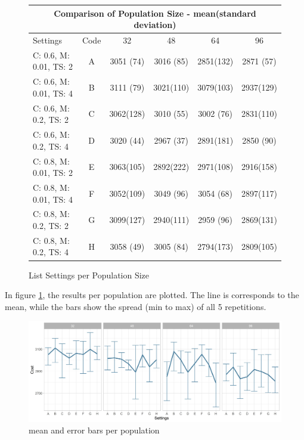 \begin{figure}[!h]
	\centering
\begin{tabular}{ |l|c||c|c|c|c|  }
	\hline
	\multicolumn{6}{|c|}{Comparison of Population Size - mean(standard deviation)} \\
	\hline
	Settings & Code & 32 & 48 & 64 & 96\\
	\hline
	C: 0.6, M: 0.01, TS: 2   	& A & 3051 (74) & 3016 (85) & 2851(132) & 2871 (57)\\
	C: 0.6, M: 0.01, TS: 4		& B & 3111 (79) & 3021(110) & 3079(103) & 2937(129)\\
	C: 0.6, M: 0.2, TS: 2 		& C & 3062(128) & 3010 (55) & 3002 (76) & 2831(110)\\
	C: 0.6, M: 0.2, TS: 4    	& D & \cellcolor{green}3020 (44) & 2967 (37) & 2891(181) & 2850 (90)\\
	C: 0.8, M: 0.01, TS: 2   	& E & 3063(105) & \cellcolor{green}2892(222) & 2971(108) & 2916(158)\\
	C: 0.8, M: 0.01, TS: 4		& F & 3052(109) & 3049 (96) & 3054 (68) & 2897(117)\\
	C: 0.8, M: 0.2, TS: 2 		& G & 3099(127) & 2940(111) & 2959 (96) & 2869(131)\\
	C: 0.8, M: 0.2, TS: 4    	& H & 3058 (49) & 3005 (84) & \cellcolor{green}2794(173) & \cellcolor{green}2809(105)\\
	\hline
\end{tabular}
\caption{List Settings per Population Size}
\end{figure}


In figure \ref{figure:population:results}, the results per population are plotted. The line is corresponds to the mean, while the bars show the spread (min to max) of all 5 repetitions.
\begin{figure}[H] 
	\label{figure:population:results}
	\includegraphics[width=1\linewidth]{simulations/population/plots/comparison}
	\caption{mean and error bars per population}
\end{figure}


